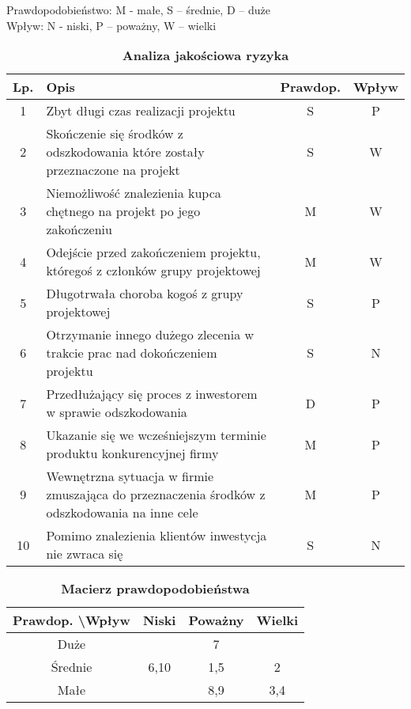 Prawdopodobieństwo:  M - małe, S – średnie, D – duże\\
Wpływ: N - niski, P – poważny, W – wielki

\begin{table}[htb]
\centering
\begin{tabular}{c|p{11.5cm}|c|c} 
Lp. & Opis & Prawdop. & Wpływ \\
 \hline 1 & Zbyt długi czas realizacji projektu & S & P \\
 2 & Skończenie się środków z odszkodowania które zostały przeznaczone na projekt & S & W \\
 3 & Niemożliwość znalezienia kupca chętnego na projekt po jego zakończeniu & M & W \\
 4 & Odejście przed zakończeniem projektu, któregoś z członków grupy projektowej & M & W \\
5 & Długotrwała choroba kogoś z grupy projektowej & S & P \\
6 & Otrzymanie innego dużego zlecenia w trakcie prac nad dokończeniem projektu & S & N \\
7 & Przedłużający się proces z inwestorem w sprawie odszkodowania & D & P \\
8 & Ukazanie się we wcześniejszym terminie produktu konkurencyjnej firmy & M & P \\
9 & Wewnętrzna sytuacja w firmie zmuszająca do przeznaczenia środków z odszkodowania na inne cele  & M & P  \\
10 & Pomimo znalezienia klientów inwestycja nie zwraca się &  S & N  \\
\end{tabular}
\caption{\textbf{Analiza jakościowa ryzyka}}
\label{tab:analizaJakosciowa}
\end{table}

\clearpage

\begin{table}[!h]
\centering
\begin{tabular}{c|c|c|c} Prawdop. \textbackslash Wpływ & Niski & Poważny & Wielki \\
 \hline Duże &  & 7 &  \\
 Średnie & 6,10 & 1,5 & 2 \\
 Małe &  & 8,9  & 3,4  \\
\end{tabular}
\caption{\textbf{Macierz prawdopodobieństwa}}
\label{tab:macierzPrawdopodobienstwa}
\end{table}




